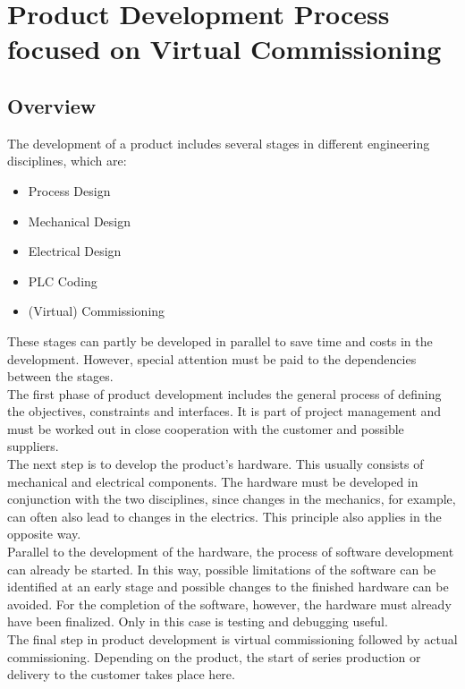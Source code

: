 \section{Product Development Process focused on Virtual Commissioning}
\subsection{Overview}
	The development of a product includes several stages in different engineering disciplines, which are:
	\begin{itemize}
		\item Process Design
		\item Mechanical Design
		\item Electrical Design 
		\item PLC Coding
		\item (Virtual) Commissioning
	\end{itemize}

	These stages can partly be developed in parallel to save time and costs in the development. However, special attention must be paid to the dependencies between the stages. \\

	The first phase of product development includes the general process of defining the objectives, constraints and interfaces. It is part of project management and must be worked out in close cooperation with the customer and possible suppliers. \\
	The next step is to develop the product's hardware. This usually consists of mechanical and electrical components. The hardware must be developed in conjunction with the two disciplines, since changes in the mechanics, for example, can often also lead to changes in the electrics. This principle also applies in the opposite way. \\
	Parallel to the development of the hardware, the process of software development can already be started. In this way, possible limitations of the software can be identified at an early stage and possible changes to the finished hardware can be avoided. For the completion of the software, however, the hardware must already have been finalized. Only in this case is testing and debugging useful.  \\
	The final step in product development is virtual commissioning followed by actual commissioning. Depending on the product, the start of series production or delivery to the customer takes place here. 


